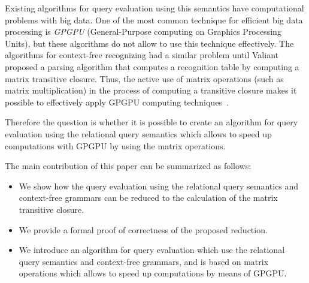 \documentclass{vldb}
\begin{document}
Existing algorithms for query evaluation using this semantics have computational problems with big data. One of the most common technique for efficient big data processing is \textit{GPGPU} (General-Purpose computing on Graphics Processing Units), but these algorithms do not allow to use this technique effectively. The algorithms for context-free recognizing had a similar problem until Valiant~\cite{valiant} proposed a parsing algorithm that computes a recognition table by computing a matrix transitive closure. Thus, the active use of matrix operations (such as matrix multiplication) in the process of computing a transitive closure makes it possible to effectively apply GPGPU computing techniques~\cite{matricesOnGPGPU}.

 Therefore the question is whether it is possible to create an algorithm for query evaluation using the relational query semantics which allows to speed up computations with GPGPU by using the matrix operations.

The main contribution of this paper can be summarized as follows:
\begin{itemize}
    \item We show how the query evaluation using the relational query semantics and context-free grammars can be reduced to the calculation of the matrix transitive closure.
    \item We provide a formal proof of correctness of the proposed reduction.
    \item We introduce an algorithm for query evaluation which use the relational query semantics and context-free grammars, and is based on matrix operations which allows to speed up computations by means of GPGPU.
\end{itemize}












\balancecolumns
\end{document}
